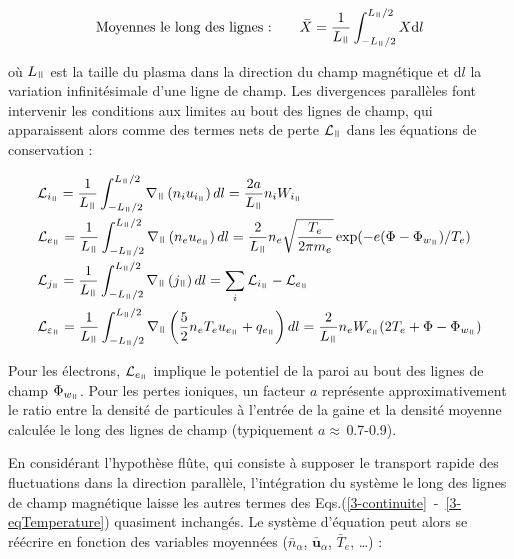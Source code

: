 \begin{refsection}
\begin{equation}
\text{Moyennes le long des lignes :\qquad}
\bar{X}=\frac{1}{L_\para}\int_{-L_\para/2}^{L_\para/2}X \text{d}l
\end{equation}

où $L_\para$ est la taille du plasma dans la direction du champ magnétique et
$\text{d}l$ la variation infinitésimale d'une ligne de champ.
Les divergences parallèles font intervenir les conditions aux limites au bout
des lignes de champ, qui apparaissent alors comme des termes nets de
perte $\mathcal L_\para$ dans les équations de conservation :

\begin{align}
\label{3-vitessesBord}
\begin{split}
\mathcal{L}&_{i_\para}=\frac{1}{L_\para}\int_{-L_\para/2}^{L_\para/2}\nabla_\para\left(n_iu_{i_\para}\right)dl=\frac{2a}{L_\para}n_iW_{i_\para}\\
\mathcal{L}&_{e_\para}=\frac{1}{L_\para}\int_{-L_\para/2}^{L_\para/2}\nabla_\para\left(n_eu_{e_\para}\right)dl=\frac{2}{L_\para}n_e\sqrt{\frac{T_e}{2\pi
m_e}}\exp(-e(\Phi-\Phi_{w_\para})/T_e)\\
\mathcal{L}&_{j_\para}=\frac{1}{L_\para}\int_{-L_\para/2}^{L_\para/2}\nabla_\para\left(j_\para\right)dl=\sum_i\mathcal{L}_{i_\para}-\mathcal{L}_{e_\para}\\
\mathcal{L}&_{\varepsilon_\para}=\frac{1}{L_\para}
\int_{-L_\para/2}^{L_\para/2}\nabla_\para
\left(\frac{5}{2}n_eT_eu_{e_\para}+q_{e_\para}\right)dl
=\frac{2}{L_\para}n_eW_{e_\para}(2T_e+\Phi-\Phi_{w_\para})
\end{split}
\end{align}

Pour les électrons, $\mathcal{L}_{e_\para}$ implique le potentiel de la
paroi au bout des lignes de champ $\Phi_{w_\para}$. Pour les pertes ioniques, un
facteur $a$ représente approximativement le ratio entre la densité de particules à l'entrée
de la gaine et la densité moyenne calculée le long des lignes de champ
(typiquement $a\approx\,$0.7-0.9).

En considérant l'hypothèse flûte, qui
consiste à supposer le transport rapide des fluctuations dans la direction
parallèle, l'intégration du système le long des lignes de champ magnétique
laisse les autres termes des
Eqs.(\ref{3-continuite}~-~\ref{3-eqTemperature}) quasiment inchangés.
Le système d'équation peut alors se réécrire en fonction des variables moyennées
($\bar{n}_\alpha$, $\bar{\mathbf u}_\alpha$, $\bar{T}_e$, \ldots) :


\end{refsection}
